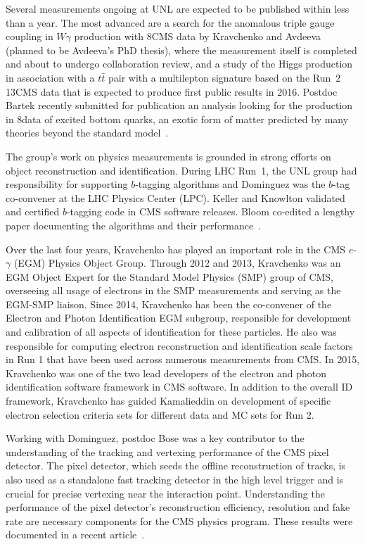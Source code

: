 Several measurements ongoing at UNL are expected to be published within less than a year. The most advanced are a search for the anomalous triple gauge coupling in $W\gamma$ production with 8\TeV CMS data by Kravchenko and Avdeeva (planned to be Avdeeva's PhD thesis), where the measurement itself is completed and about to undergo collaboration review, and a study of the Higgs production in association with a $t\bar{t}$ pair with a multilepton signature based on the Run~2 13\TeV CMS data that is expected to produce first public results in 2016.  Postdoc Bartek recently submitted for publication an analysis looking for the production in 8\TeV data of excited bottom quarks, an exotic form of matter predicted by many theories beyond the standard model~\cite{bib:bstar}. 

%
%

The group's work on physics measurements is grounded in strong efforts on object reconstruction and identification.  During LHC Run~1, the UNL group had responsibility for supporting $b$-tagging algorithms and Dominguez was the $b$-tag co-convener at the LHC Physics Center (LPC).  Keller and Knowlton validated and certified $b$-tagging code in CMS software releases.  Bloom co-edited a lengthy paper documenting the algorithms and their performance~\cite{bib:btagperformance}.

Over the last four years, Kravchenko has played an important role in the CMS $e$-$\gamma$ (EGM) Physics Object Group. Through 2012 and 2013, Kravchenko was an EGM Object Expert for the Standard Model Physics (SMP) group of CMS, overseeing all usage of electrons in the SMP measurements and serving as the EGM-SMP liaison. Since 2014, Kravchenko has been the co-convener of the Electron and Photon Identification EGM subgroup, responsible for development and calibration of all aspects of identification for these particles. He also was responsible for computing electron reconstruction and identification scale factors in Run 1 \cite{bib:EGM-Run1-SF} that have been used across numerous measurements from CMS. In 2015, Kravchenko was one of the two lead developers of the electron and photon identification software framework in CMS software. In addition to the overall ID framework, Kravchenko has guided Kamalieddin on development of specific electron selection criteria sets for different data and MC sets for Run 2.  

Working with Dominguez, postdoc Bose was a key contributor to the understanding of the tracking and vertexing performance of the CMS pixel detector.  The pixel detector, which seeds the offline reconstruction of tracks, is also used as a standalone fast tracking detector in the high level trigger and is crucial for precise vertexing near the interaction point.  Understanding the performance of the pixel detector's reconstruction efficiency, resolution and fake rate are necessary components for the CMS physics program.  These results were documented in a recent article~\cite{bib:trackperf}. 

